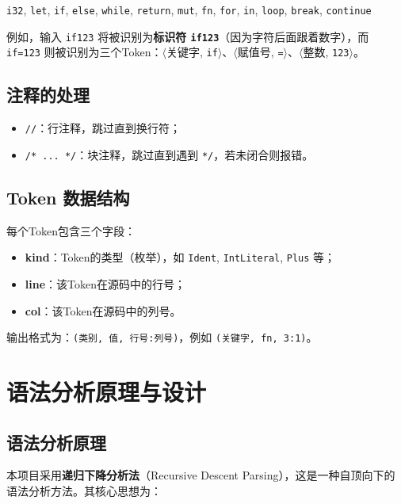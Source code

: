 \documentclass[12pt,a4paper]{ctexart}
\begin{document}
\begin{center}
\texttt{i32}, \texttt{let}, \texttt{if}, \texttt{else}, \texttt{while}, \texttt{return}, \texttt{mut}, \texttt{fn}, \texttt{for}, \texttt{in}, \texttt{loop}, \texttt{break}, \texttt{continue}
\end{center}

例如，输入 \texttt{if123} 将被识别为\textbf{标识符 \texttt{if123}}（因为字符后面跟着数字），而 \texttt{if=123} 则被识别为三个Token：$\langle$关键字, \texttt{if}$\rangle$、$\langle$赋值号, \texttt{=}$\rangle$、$\langle$整数, \texttt{123}$\rangle$。

\subsection{注释的处理}

\begin{itemize}
    \item \texttt{//}：行注释，跳过直到换行符；
    \item \texttt{/* ... */}：块注释，跳过直到遇到 \texttt{*/}，若未闭合则报错。
\end{itemize}

\subsection{Token 数据结构}

每个Token包含三个字段：
\begin{itemize}
    \item \textbf{kind}：Token的类型（枚举），如 \texttt{Ident}, \texttt{IntLiteral}, \texttt{Plus} 等；
    \item \textbf{line}：该Token在源码中的行号；
    \item \textbf{col}：该Token在源码中的列号。
\end{itemize}

输出格式为：\texttt{(类别, 值, 行号:列号)}，例如 \texttt{(关键字, fn, 3:1)}。


\section{语法分析原理与设计}

\subsection{语法分析原理}

本项目采用\textbf{递归下降分析法}（Recursive Descent Parsing），这是一种自顶向下的语法分析方法。其核心思想为：
\end{document}

